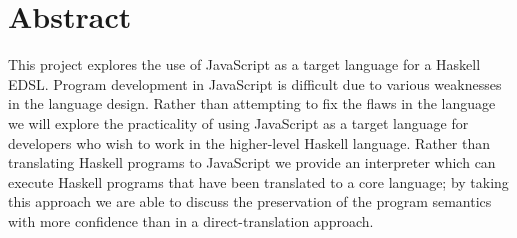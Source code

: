\section*{Abstract} 
 This project explores the use of JavaScript as a target language for a Haskell EDSL. Program development in JavaScript is difficult due to various weaknesses in the language design. Rather than attempting to fix the flaws in the language we will explore the practicality of using JavaScript as a target language for developers who wish to work in the higher-level Haskell language. Rather than translating Haskell programs to JavaScript we provide an interpreter which can execute Haskell programs that have been translated to a core language; by taking this approach we are able to discuss the preservation of the program semantics with more confidence than in a direct-translation approach.